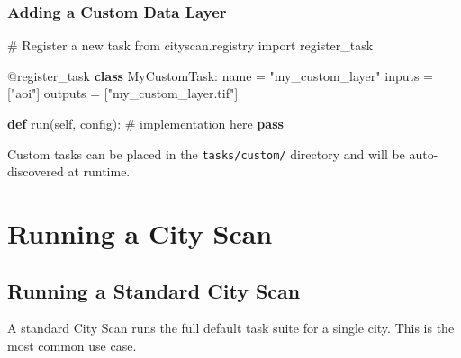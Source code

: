 \documentclass[
  letterpaper,
  DIV=11,
  numbers=noendperiod]{scrreprt}
\newenvironment{Shaded}{\begin{snugshade}}{\end{snugshade}}
\newcommand{\AttributeTok}[1]{\textcolor[rgb]{0.40,0.45,0.13}{#1}}
\newcommand{\CommentTok}[1]{\textcolor[rgb]{0.37,0.37,0.37}{#1}}
\newcommand{\ControlFlowTok}[1]{\textcolor[rgb]{0.00,0.23,0.31}{\textbf{#1}}}
\newcommand{\ImportTok}[1]{\textcolor[rgb]{0.00,0.46,0.62}{#1}}
\newcommand{\KeywordTok}[1]{\textcolor[rgb]{0.00,0.23,0.31}{\textbf{#1}}}
\newcommand{\NormalTok}[1]{\textcolor[rgb]{0.00,0.23,0.31}{#1}}
\newcommand{\OperatorTok}[1]{\textcolor[rgb]{0.37,0.37,0.37}{#1}}
\newcommand{\StringTok}[1]{\textcolor[rgb]{0.13,0.47,0.30}{#1}}
\newcommand{\VariableTok}[1]{\textcolor[rgb]{0.07,0.07,0.07}{#1}}
\begin{document}
\section{Adding a Custom Data Layer}\label{adding-a-custom-data-layer}

\begin{Shaded}
\begin{Highlighting}[]
\CommentTok{\# Register a new task}
\ImportTok{from}\NormalTok{ cityscan.registry }\ImportTok{import}\NormalTok{ register\_task}

\AttributeTok{@register\_task}
\KeywordTok{class}\NormalTok{ MyCustomTask:}
\NormalTok{    name }\OperatorTok{=} \StringTok{"my\_custom\_layer"}
\NormalTok{    inputs }\OperatorTok{=}\NormalTok{ [}\StringTok{"aoi"}\NormalTok{]}
\NormalTok{    outputs }\OperatorTok{=}\NormalTok{ [}\StringTok{"my\_custom\_layer.tif"}\NormalTok{]}

    \KeywordTok{def}\NormalTok{ run(}\VariableTok{self}\NormalTok{, config):}
        \CommentTok{\# implementation here}
        \ControlFlowTok{pass}
\end{Highlighting}
\end{Shaded}

\begin{tcolorbox}[enhanced jigsaw, arc=.35mm, bottomrule=.15mm, bottomtitle=1mm, breakable, colback=white, colbacktitle=quarto-callout-tip-color!10!white, colframe=quarto-callout-tip-color-frame, coltitle=black, left=2mm, leftrule=.75mm, opacityback=0, opacitybacktitle=0.6, rightrule=.15mm, title=\textcolor{quarto-callout-tip-color}{\faLightbulb}\hspace{0.5em}{Tip}, titlerule=0mm, toprule=.15mm, toptitle=1mm]

Custom tasks can be placed in the \texttt{tasks/custom/} directory and
will be auto-discovered at runtime.

\end{tcolorbox}

\part{Running a City Scan}

\chapter{Running a Standard City
Scan}\label{running-a-standard-city-scan}

A standard City Scan runs the full default task suite for a single city.
This is the most common use case.
\end{document}

